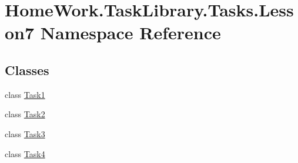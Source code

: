 \hypertarget{namespace_home_work_1_1_task_library_1_1_tasks_1_1_lesson7}{}\section{Home\+Work.\+Task\+Library.\+Tasks.\+Lesson7 Namespace Reference}
\label{namespace_home_work_1_1_task_library_1_1_tasks_1_1_lesson7}
\subsection*{Classes}
\begin{DoxyCompactItemize}
\item 
class \mbox{\hyperlink{class_home_work_1_1_task_library_1_1_tasks_1_1_lesson7_1_1_task1}{Task1}}
\item 
class \mbox{\hyperlink{class_home_work_1_1_task_library_1_1_tasks_1_1_lesson7_1_1_task2}{Task2}}
\item 
class \mbox{\hyperlink{class_home_work_1_1_task_library_1_1_tasks_1_1_lesson7_1_1_task3}{Task3}}
\item 
class \mbox{\hyperlink{class_home_work_1_1_task_library_1_1_tasks_1_1_lesson7_1_1_task4}{Task4}}
\end{DoxyCompactItemize}
